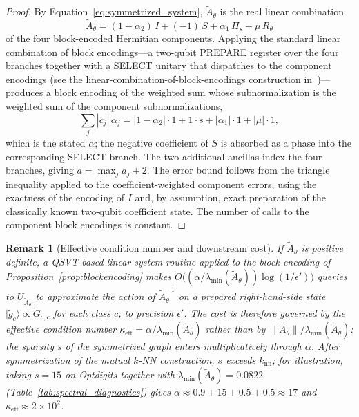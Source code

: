 \documentclass[11pt,a4paper]{article}
\newtheorem{remark}{Remark}
\begin{document}
\begin{proof}
By Equation~\eqref{eq:symmetrized_system}, $\widetilde A_\theta$ is the
real linear combination
\[
\widetilde A_\theta
=
(1-\alpha_2)\,I
+
(-1)\,S
+
\alpha_1\,\Pi_s
+
\mu\,R_\theta
\]
of the four block-encoded Hermitian components. Applying the standard
linear combination of block encodings---a two-qubit PREPARE register over
the four branches together with a SELECT unitary that dispatches to the
component encodings (see the linear-combination-of-block-encodings
construction in~\cite{gilyen2019quantum,childs2012})---produces a block
encoding of the weighted sum whose subnormalization is the weighted sum of
the component subnormalizations,
\[
\sum_j |c_j|\,\alpha_j
=
|1-\alpha_2|\cdot 1
+
1\cdot s
+
|\alpha_1|\cdot 1
+
|\mu|\cdot 1,
\]
which is the stated $\alpha$; the negative coefficient of $S$ is absorbed
as a phase into the corresponding SELECT branch. The two additional
ancillas index the four branches, giving $a=\max_j a_j+2$. The error bound
follows from the triangle inequality applied to the coefficient-weighted
component errors, using the exactness of the encoding of $I$ and, by
assumption, exact preparation of the classically known two-qubit
coefficient state. The number of calls to the component block encodings is
constant.
\end{proof}

\begin{remark}[Effective condition number and downstream cost]
\label{rem:kappa_eff}
If $\widetilde A_\theta$ is positive definite, a QSVT-based linear-system
routine applied to the block encoding of
Proposition~\ref{prop:blockencoding} makes
$O\!\bigl((\alpha/\lambda_{\min}(\widetilde A_\theta))\log(1/\epsilon')\bigr)$
queries to $U_{\widetilde A_\theta}$ to approximate the action of
$\widetilde A_\theta^{-1}$ on a prepared right-hand-side state
$|\widetilde g_c\rangle\propto\widetilde G_{:,c}$ for each class $c$, to
precision $\epsilon'$. The cost is therefore governed by the effective
condition number
$\kappa_{\mathrm{eff}}=\alpha/\lambda_{\min}(\widetilde A_\theta)$ rather
than by $\|\widetilde A_\theta\|/\lambda_{\min}(\widetilde A_\theta)$: the
sparsity $s$ of the symmetrized graph enters multiplicatively through
$\alpha$. After symmetrization of the mutual $k$-NN construction, $s$
exceeds $k_{\mathrm{nn}}$; for illustration, taking $s=15$ on Optdigits
together with
$\lambda_{\min}(\widetilde A_\theta)=0.0822$
(Table~\ref{tab:spectral_diagnostics}) gives
$\alpha\approx 0.9+15+0.5+0.5\approx 17$ and
$\kappa_{\mathrm{eff}}\approx 2\times 10^{2}$.
\end{remark}
\end{document}
